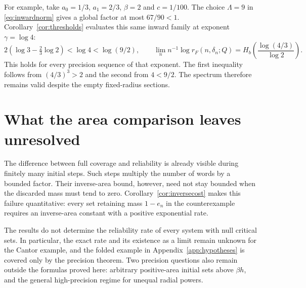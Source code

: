 \documentclass[11pt]{amsart}
\theoremstyle{definition}
\theoremstyle{remark}
\numberwithin{equation}{section}
\begin{document}
For example, take $a_0=1/3$, $a_1=2/3$, $\beta=2$ and $c=1/100$.
The choice $\Lambda=9$ in \eqref{eq:inwardnorm} gives a global
factor at most $67/90<1$. Corollary~\ref{cor:thresholds} evaluates
this same inward family at exponent $\gamma=\log4$:
\[
2\left(\log3-\tfrac23\log2\right)<\log4<\log(9/2),\qquad
\lim_n n^{-1}\log r_F(n,\delta_n;Q)
 =H_b\!\left(\frac{\log(4/3)}{\log2}\right).
\]
This holds for every precision sequence of that exponent.
The first inequality follows from $(4/3)^3>2$ and the second
from $4<9/2$. The spectrum therefore remains valid despite the
empty fixed-radius sections.


\section{What the area comparison leaves unresolved}
The difference between full coverage and reliability is already
visible during finitely many initial steps. Such steps multiply
the number of words by a bounded factor. Their inverse-area bound,
however, need not stay bounded when the discarded mass must tend
to zero. Corollary~\ref{cor:inversecost} makes this failure
quantitative: every set retaining mass $1-e_n$ in the counterexample
requires an inverse-area constant with a positive exponential rate.

The results do not determine the reliability rate of every system
with null critical sets. In particular, the exact rate and its
existence as a limit remain unknown for the Cantor example, and
the folded example in Appendix~\ref{app:hypotheses} is covered
only by the precision theorem. Two precision questions also remain
outside the formulas proved here: arbitrary positive-area initial
sets above $\beta h$, and the general high-precision regime for
unequal radial powers.

\appendix
\end{document}
